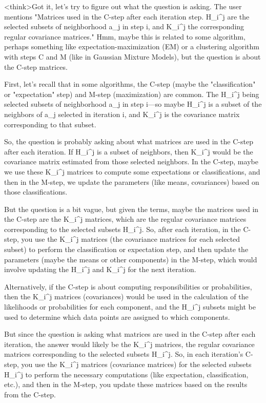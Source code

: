 <think>Got it, let's try to figure out what the question is asking. The user mentions "Matrices used in the C-step after each iteration step. H_i^j are the selected subsets of neighborhood a_j in step i, and K_i^j the corresponding regular covariance matrices." Hmm, maybe this is related to some algorithm, perhaps something like expectation-maximization (EM) or a clustering algorithm with steps C and M (like in Gaussian Mixture Models), but the question is about the C-step matrices.

First, let's recall that in some algorithms, the C-step (maybe the "classification" or "expectation" step) and M-step (maximization) are common. The H_i^j being selected subsets of neighborhood a_j in step i—so maybe H_i^j is a subset of the neighbors of a_j selected in iteration i, and K_i^j is the covariance matrix corresponding to that subset. 

So, the question is probably asking about what matrices are used in the C-step after each iteration. If H_i^j is a subset of neighbors, then K_i^j would be the covariance matrix estimated from those selected neighbors. In the C-step, maybe we use these K_i^j matrices to compute some expectations or classifications, and then in the M-step, we update the parameters (like means, covariances) based on those classifications.

But the question is a bit vague, but given the terms, maybe the matrices used in the C-step are the K_i^j matrices, which are the regular covariance matrices corresponding to the selected subsets H_i^j. So, after each iteration, in the C-step, you use the K_i^j matrices (the covariance matrices for each selected subset) to perform the classification or expectation step, and then update the parameters (maybe the means or other components) in the M-step, which would involve updating the H_i^j and K_i^j for the next iteration.

Alternatively, if the C-step is about computing responsibilities or probabilities, then the K_i^j matrices (covariances) would be used in the calculation of the likelihoods or probabilities for each component, and the H_i^j subsets might be used to determine which data points are assigned to which components.

But since the question is asking what matrices are used in the C-step after each iteration, the answer would likely be the K_i^j matrices, the regular covariance matrices corresponding to the selected subsets H_i^j. So, in each iteration's C-step, you use the K_i^j matrices (covariance matrices) for the selected subsets H_i^j to perform the necessary computations (like expectation, classification, etc.), and then in the M-step, you update these matrices based on the results from the C-step.

